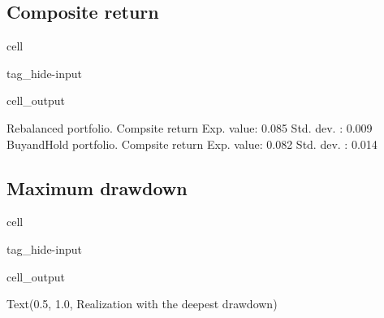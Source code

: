 \documentclass[letterpaper,10pt,english]{jupyterBook}
\begin{document}
\subsection{Composite return}
\label{\detokenize{code/notebooks/rebalancing:composite-return}}
\begin{sphinxuseclass}{cell}
\begin{sphinxuseclass}{tag_hide-input}\begin{sphinxVerbatimOutput}

\begin{sphinxuseclass}{cell_output}
\begin{sphinxVerbatim}[commandchars=\\\{\}]
Rebalanced portfolio. Compsite return
 Exp. value: 0.085
 Std. dev. : 0.009
Buy\PYGZhy{}and\PYGZhy{}Hold portfolio. Compsite return
 Exp. value: 0.082
 Std. dev. : 0.014
\end{sphinxVerbatim}

\noindent{}

\end{sphinxuseclass}\end{sphinxVerbatimOutput}

\end{sphinxuseclass}
\end{sphinxuseclass}

\subsection{Maximum drawdown}
\label{\detokenize{code/notebooks/rebalancing:maximum-drawdown}}
\begin{sphinxuseclass}{cell}
\begin{sphinxuseclass}{tag_hide-input}\begin{sphinxVerbatimOutput}

\begin{sphinxuseclass}{cell_output}
\begin{sphinxVerbatim}[commandchars=\\\{\}]
Text(0.5, 1.0, \PYGZsq{}Realization with the deepest drawdown\PYGZsq{})
\end{sphinxVerbatim}

\noindent{}

\end{sphinxuseclass}\end{sphinxVerbatimOutput}

\end{sphinxuseclass}
\end{sphinxuseclass}
\sphinxstepscope
\end{document}

